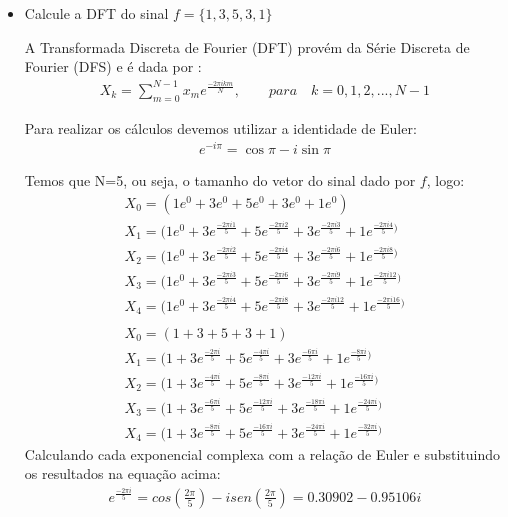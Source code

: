 \documentclass[12pt]{article}
\begin{document}
\begin{itemize}
\begin{itemize}
\item Calcule a DFT do sinal $f = \{1,3,5,3,1\}$

A Transformada Discreta de Fourier (DFT) provém da Série Discreta de Fourier (DFS) e é dada por \cite{broughton2009discrete}:
\begin{align*}
    X_k = \sum\limits_{m=0}^{N-1} x_m e^{\frac{-2\pi ikm}{N}},\qquad para\quad k=0,1,2,...,N-1
\end{align*}

Para realizar os cálculos devemos utilizar a identidade de Euler:
\begin{align*}
    e^{-i \pi} = \cos \pi - i\sin\pi
\end{align*}

Temos que N=5, ou seja, o tamanho do vetor do sinal dado por $f$, logo:
\begin{align*}
    &X_0 = (1e^0 + 3e^0 + 5e^0 + 3e^0 + 1e^0) &\\
    &X_1 = (1e^0 + 3e^{\frac{-2\pi i1}{5}} + 5e^{\frac{-2\pi i2}{5}} + 3e^{\frac{-2\pi i3}{5}} + 1e^{\frac{-2\pi i4}{5})} &\\
    &X_2 = (1e^0 + 3e^{\frac{-2\pi i2}{5}} + 5e^{\frac{-2\pi i4}{5}} + 3e^{\frac{-2\pi i6}{5}} + 1e^{\frac{-2\pi i8}{5})} &\\
    &X_3 = (1e^0 + 3e^{\frac{-2\pi i3}{5}} + 5e^{\frac{-2\pi i6}{5}} + 3e^{\frac{-2\pi i9}{5}} + 1e^{\frac{-2\pi i12}{5})} &\\
    &X_4 = (1e^0 + 3e^{\frac{-2\pi i4}{5}} + 5e^{\frac{-2\pi i8}{5}} + 3e^{\frac{-2\pi i12}{5}} + 1e^{\frac{-2\pi i16}{5})} &\\
    \\&X_0 = (1 + 3 + 5 + 3 + 1) &\\
    &X_1 = (1 + 3e^{\frac{-2\pi i}{5}} + 5e^{\frac{-4\pi i}{5}}  + 3e^{\frac{-6\pi i}{5}}  + 1e^{\frac{-8\pi i}{5})} &\\
    &X_2 = (1 + 3e^{\frac{-4\pi i}{5}} + 5e^{\frac{-8\pi i}{5}}  + 3e^{\frac{-12\pi i}{5}} + 1e^{\frac{-16\pi i}{5})} &\\
    &X_3 = (1 + 3e^{\frac{-6\pi i}{5}} + 5e^{\frac{-12\pi i}{5}} + 3e^{\frac{-18\pi i}{5}} + 1e^{\frac{-24\pi i}{5})} &\\
    &X_4 = (1 + 3e^{\frac{-8\pi i}{5}} + 5e^{\frac{-16\pi i}{5}} + 3e^{\frac{-24\pi i}{5}} + 1e^{\frac{-32\pi i}{5})}&
\end{align*}
Calculando cada exponencial complexa com a relação de Euler e substituindo os resultados na equação acima:
\begin{align*}
    &e^{\frac{-2\pi i}{5}} = cos(\frac{2\pi}{5}) - isen(\frac{2\pi}{5}) = 0.30902  - 0.95106i &\\

\end{align*}
\end{itemize}
\end{itemize}
\end{document}
